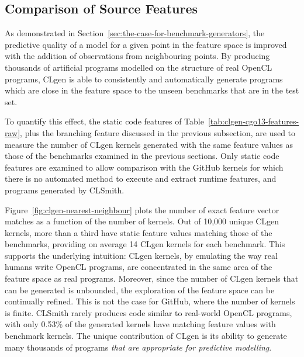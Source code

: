 \subsection{Comparison of Source Features}

As demonstrated in Section~\ref{sec:the-case-for-benchmark-generators}, the predictive quality of a model for a given point in the feature space is improved with the addition of observations from neighbouring points. By producing thousands of artificial programs modelled on the structure of real OpenCL programs, CLgen is able to consistently and automatically generate programs which are close in the feature space to the unseen benchmarks that are in the test set.

To quantify this effect, the static code features of Table~\ref{tab:clgen-cgo13-features-raw}, plus the branching feature discussed in the previous subsection, are used to measure the number of CLgen kernels generated with the same feature values as those of the benchmarks examined in the previous sections. Only static code features are examined to allow comparison with the GitHub kernels for which there is no automated method to execute and extract runtime features, and programs generated by CLSmith.

Figure~\ref{fig:clgen-nearest-neighbour} plots the number of exact feature vector matches as a function of the number of kernels. Out of 10,000 unique CLgen kernels, more than a third have static feature values matching those of the benchmarks, providing on average 14 CLgen kernels for each benchmark. This supports the underlying intuition: CLgen kernels, by emulating the way real humans write OpenCL programs, are concentrated in the same area of the feature space as real programs. Moreover, since the number of CLgen kernels that can be generated is unbounded, the exploration of the feature space can be continually refined. This is not the case for GitHub, where the number of kernels is finite. CLSmith rarely produces code similar to real-world OpenCL programs, with only 0.53\% of the generated kernels have matching feature values with benchmark kernels. The unique contribution of CLgen is its ability to generate many thousands of programs \textit{that are appropriate for predictive modelling}.

